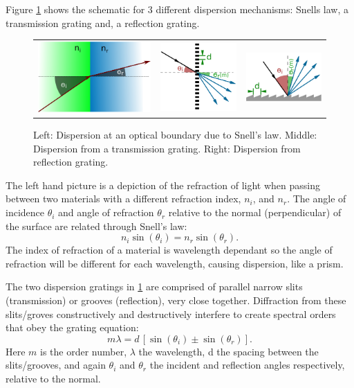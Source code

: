 Figure \cref{fig:dispersion_elements} shows the schematic for 3 different dispersion mechanisms: Snells law, a transmission grating and, a reflection grating.

\begin{figure}
    \centering
    \begin{tabular}{ccc}
   \includegraphics[width=0.3\linewidth]{figures/spectroscopy/snells_law} & \includegraphics[width=0.2\linewidth]{figures/spectroscopy/dispersion_grism-transmission} & \includegraphics[width=0.3\linewidth]{figures/spectroscopy/dispersion_grism-reflection} \\
\end{tabular}
    \caption[Dispersion mechanisms.]{Left: Dispersion at an optical boundary due to Snell's law.
        Middle: Dispersion from a transmission grating.
        Right: Dispersion from reflection grating.}
    \label{fig:dispersion_elements}
\end{figure}
The left hand picture is a depiction of the refraction of light when passing between two materials with a different refraction index, $n_{i}$, and $n_{r}$.
The angle of incidence $\theta_{i}$ and angle of refraction $\theta_{r}$ relative to the normal (perpendicular) of the surface are related through Snell's law:
\[n_{i} \sin(\theta_{i}) = n_{r} \sin(\theta_{r}).\]
The index of refraction of a material is wavelength dependant so the angle of refraction will be different for each wavelength, causing dispersion, like a prism.

The two dispersion gratings in \cref{fig:dispersion_elements} are comprised of parallel narrow slits (transmission) or grooves (reflection), very close together.
Diffraction from these slits/groves constructively and destructively interfere to create spectral orders that obey the grating equation:
\begin{equation}
m \lambda = d \, [\sin(\theta_{i}) \pm \sin(\theta_{r})].
\end{equation}
Here \(m\) is the order number, \(\lambda\) the wavelength, d the spacing between the slits/grooves, and again $\theta_{i}$ and $\theta_{r}$ the incident and reflection angles respectively, relative to the normal.

